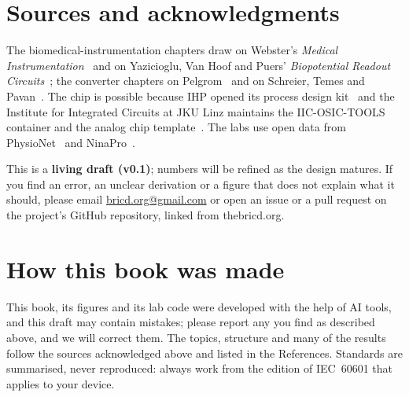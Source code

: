 \section*{Sources and acknowledgments}
The biomedical-instrumentation chapters draw on Webster's \emph{Medical Instrumentation}~\cite{webster} and on Yazicioglu, Van Hoof and Puers' \emph{Biopotential Readout Circuits}~\cite{yazicioglubook}; the converter chapters on Pelgrom~\cite{pelgrom} and on Schreier, Temes and Pavan~\cite{schreier}. The chip is possible because IHP opened its \sgx{} process design kit~\cite{ihppdk} and the Institute for Integrated Circuits at JKU Linz maintains the IIC-OSIC-TOOLS container and the analog chip template~\cite{iicosic,jkutemplate}. The labs use open data from PhysioNet~\cite{physionet} and NinaPro~\cite{ninapro}.

This is a \textbf{living draft (v0.1)}; numbers will be refined as the design matures. If you find an error, an unclear derivation or a figure that does not explain what it should, please email \href{mailto:bricd.org@gmail.com}{bricd.org@gmail.com} or open an issue or a pull request on the project's GitHub repository, linked from thebricd.org.

\section*{How this book was made}
This book, its figures and its lab code were developed with the help of AI tools, and this draft may contain mistakes; please report any you find as described above, and we will correct them. The topics, structure and many of the results follow the sources acknowledged above and listed in the References. Standards are summarised, never reproduced: always work from the edition of IEC~60601 that applies to your device.
